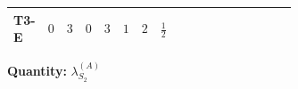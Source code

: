 \documentclass[8pt]{article}
\begin{document}
\begin{landscape}
\begin{longtable}{@{}llcccccc >{\raggedright\arraybackslash}p{0.21\linewidth} >{\raggedright\arraybackslash}p{0.21\linewidth} >{\raggedright\arraybackslash}p{0.21\linewidth}@{}}
\midrule
T3-E & $0$ & $3$ & $0$ & $3$ & $1$ & $2$ & $\frac{1}{2}$ & \scriptsize\adjustbox{max width=\linewidth}{$\begin{gathered} \frac{3 {g_2}^4}{4}\end{gathered}$} & \scriptsize\adjustbox{max width=\linewidth}{$\begin{gathered} +{g_1}^2 \left(9 {g_2}^2-\frac{3 {\lambda_{S_2}^{(1)}}}{2}-12 {\lambda_{S_2}^{(A)}}\right)\end{gathered}$} & \scriptsize\adjustbox{max width=\linewidth}{$\begin{gathered} +{g_2}^2 (-3 {\lambda_{S_2}^{(1)}}-24 {\lambda_{S_2}^{(A)}})\end{gathered}$} \\
\midrule
\bottomrule
\end{longtable}
\clearpage
\noindent\textbf{Quantity: }$\lambda_{S_2}^{(A)}$\par\smallskip

\end{landscape}
\end{document}
